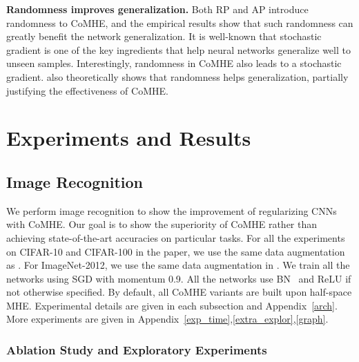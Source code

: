 \par
\textbf{Randomness improves generalization.} Both RP and AP introduce randomness to CoMHE, and the empirical results show that such randomness can greatly benefit the network generalization. It is well-known that stochastic gradient is one of the key ingredients that help neural networks generalize well to unseen samples. Interestingly, randomness in CoMHE also leads to a stochastic gradient. \cite{kawaguchi2018deep} also theoretically shows that randomness helps generalization, partially justifying the effectiveness of CoMHE.

\section{Experiments and Results}\label{expandresult}

\subsection{Image Recognition}

We perform image recognition to show the improvement of regularizing CNNs with CoMHE. Our goal is to show the superiority of CoMHE rather than achieving state-of-the-art accuracies on particular tasks. For all the experiments on CIFAR-10 and CIFAR-100 in the paper, we use the same data augmentation as \cite{he2015deep,liu2018decoupled}. For ImageNet-2012, we use the same data augmentation in \cite{liu2017hyper}. We train all the networks using SGD with momentum 0.9. All the networks use BN~\cite{ioffe2015batch} and ReLU if not otherwise specified. By default, all CoMHE variants are built upon half-space MHE. Experimental details are given in each subsection and Appendix~\ref{arch}. More experiments are given in Appendix~\ref{exp_time},\ref{extra_explor},\ref{graph}.

\subsubsection{Ablation Study and Exploratory Experiments}\label{cifar_explore}

